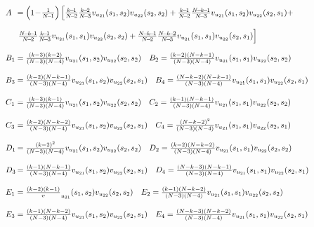 \documentclass[11pt]{article}
\theoremstyle{plainCl1}
\theoremstyle{plainCl2}
\begin{document}
\begin{equation}
  \resizebox{.9\textwidth}{!}
  {%
$
  \setlength{\arraycolsep}{1pt}
  \begin{array}{llrl}
  A & = \left(1\!-\!\frac{1}{N\!-\!1}\right)  \left[ \frac{k\!-\!1}{N\!-\!2}\frac{k\!-\!2}{N\!-\!3} v_{u_{21}}(s_1,s_2) v_{u_{22}}(s_2,s_2) + 
   \frac{k\!-\!1}{N\!-\!2}\frac{N\!-\!k\!-\!1}{N\!-\!3} v_{u_{21}}(s_1,s_2) v_{u_{22}}(s_2,s_1) + \right. \\[0.5cm]
   & \left. \frac{N\!-\!k\!-\!1}{N\!-\!2}\frac{k\!-\!1}{N\!-\!3} v_{u_{21}}(s_1,s_1) v_{u_{22}}(s_2,s_2) + 
   \frac{N\!-\!k\!-\!1}{N\!-\!2}\frac{N\!-\!k\!-\!2}{N\!-\!3} v_{u_{21}}(s_1,s_1) v_{u_{22}}(s_2,s_1)\right] \\[0.5cm] 
   B_1 & = \frac{\left(k - 3\right) \left(k - 2\right)}{(N - 3) (N - 4)} v_{u_{21}}(s_1,s_2) v_{u_{22}}(s_2,s_2) \quad
   B_2 = \frac{\left(k - 2\right) \left(N - k - 1\right)}{(N - 3) (N - 4)} v_{u_{21}}(s_1,s_1) v_{u_{22}}(s_2,s_2) \\[0.5cm] 
   B_3 & = \frac{\left(k - 2\right) \left(N - k - 1\right)}{(N - 3) (N - 4)} v_{u_{21}}(s_1,s_2) v_{u_{22}}(s_2,s_1) \quad
   B_4 = \frac{\left(N - k - 2\right) \left(N - k - 1\right)}{(N - 3) (N - 4)} v_{u_{21}}(s_1,s_1) v_{u_{22}}(s_2,s_1) \\[0.5cm] 

   C_1 & = \frac{\left(k - 3\right) \left(k - 1\right)}{(N - 3) (N - 4)} v_{u_{21}}(s_1,s_2) v_{u_{22}}(s_2,s_2) \quad
   C_2 = \frac{\left(k - 1\right) \left(N - k - 1\right)}{(N - 3) (N - 4)} v_{u_{21}}(s_1,s_1) v_{u_{22}}(s_2,s_2) \\[0.5cm] 
   C_3 & = \frac{\left(k - 2\right) \left(N - k - 2\right)}{(N - 3) (N - 4)} v_{u_{21}}(s_1,s_2) v_{u_{22}}(s_2,s_1) \quad
   C_4 = \frac{\left(N - k - 2\right)^{2}}{(N - 3) (N - 4)} v_{u_{21}}(s_1,s_1) v_{u_{22}}(s_2,s_1) \\[0.5cm] 

   D_1 & = \frac{\left(k - 2\right)^{2}}{(N - 3) (N - 4)} v_{u_{21}}(s_1,s_2) v_{u_{22}}(s_2,s_2) \quad
   D_2 = \frac{\left(k - 2\right) \left(N - k - 2\right)}{(N - 3) (N - 4)} v_{u_{21}}(s_1,s_1) v_{u_{22}}(s_2,s_2) \\[0.5cm] 
   D_3 & = \frac{\left(k - 1\right) \left(N - k - 1\right)}{(N - 3) (N - 4)} v_{u_{21}}(s_1,s_2) v_{u_{22}}(s_2,s_1) \quad
   D_4 = \frac{\left(N - k - 3\right) \left(N - k - 1\right)}{(N - 3) (N - 4)} v_{u_{21}}(s_1,s_1) v_{u_{22}}(s_2,s_1) \\[0.5cm]

   E_1 & = \frac{\left(k - 2\right) \left(k - 1\right)} v_{u_{21}}(s_1,s_2) v_{u_{22}}(s_2,s_2) \quad
   E_2 = \frac{\left(k - 1\right) \left(N - k - 2\right)}{(N - 3) (N - 4)} v_{u_{21}}(s_1,s_1) v_{u_{22}}(s_2,s_2) \\[0.5cm] 
   E_3 & = \frac{\left(k - 1\right) \left(N - k - 2\right)}{(N - 3) (N - 4)} v_{u_{21}}(s_1,s_2) v_{u_{22}}(s_2,s_1) \quad
   E_4 = \frac{\left(N - k - 3\right) \left(N - k - 2\right)}{(N - 3) (N - 4)} v_{u_{21}}(s_1,s_1) v_{u_{22}}(s_2,s_1) \\[0.5cm] 
  \end{array}$}
\end{equation}
\end{document}
